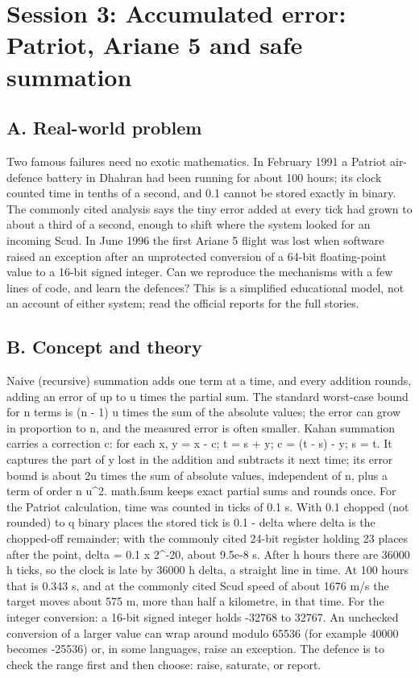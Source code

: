 \documentclass[11pt,a4paper]{article}
\begin{document}
\section{Session 3: Accumulated error: Patriot, Ariane 5 and safe summation}

\subsection*{A. Real-world problem}
Two famous failures need no exotic mathematics. In February 1991 a Patriot air-defence battery in Dhahran had been running for about 100 hours; its clock counted time in tenths of a second, and 0.1 cannot be stored exactly in binary. The commonly cited analysis says the tiny error added at every tick had grown to about a third of a second, enough to shift where the system looked for an incoming Scud. In June 1996 the first Ariane 5 flight was lost when software raised an exception after an unprotected conversion of a 64-bit floating-point value to a 16-bit signed integer. Can we reproduce the mechanisms with a few lines of code, and learn the defences? This is a simplified educational model, not an account of either system; read the official reports for the full stories.

\subsection*{B. Concept and theory}
Naive (recursive) summation adds one term at a time, and every addition rounds, adding an error of up to u times the partial sum. The standard worst-case bound for n terms is (n - 1) u times the sum of the absolute values; the error can grow in proportion to n, and the measured error is often smaller. Kahan summation carries a correction c: for each x, y = x - c; t = s + y; c = (t - s) - y; s = t. It captures the part of y lost in the addition and subtracts it next time; its error bound is about 2u times the sum of absolute values, independent of n, plus a term of order n u\textasciicircum{}2. math.fsum keeps exact partial sums and rounds once. For the Patriot calculation, time was counted in ticks of 0.1 s. With 0.1 chopped (not rounded) to q binary places the stored tick is 0.1 - delta where delta is the chopped-off remainder; with the commonly cited 24-bit register holding 23 places after the point, delta = 0.1 x 2\textasciicircum{}-20, about 9.5e-8 s. After h hours there are 36000 h ticks, so the clock is late by 36000 h delta, a straight line in time. At 100 hours that is 0.343 s, and at the commonly cited Scud speed of about 1676 m/s the target moves about 575 m, more than half a kilometre, in that time. For the integer conversion: a 16-bit signed integer holds -32768 to 32767. An unchecked conversion of a larger value can wrap around modulo 65536 (for example 40000 becomes -25536) or, in some languages, raise an exception. The defence is to check the range first and then choose: raise, saturate, or report.
\end{document}
